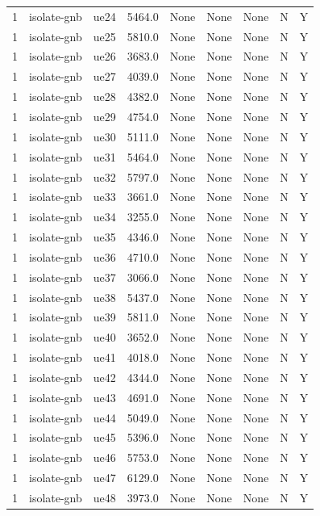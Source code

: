 \begin{table}[ht]
\begin{tabular}{|c|c|c|c|c|c|c|c|c|}
1 & isolate-gnb & ue24 & 5464.0 & None & None & None & N & Y \\
1 & isolate-gnb & ue25 & 5810.0 & None & None & None & N & Y \\
1 & isolate-gnb & ue26 & 3683.0 & None & None & None & N & Y \\
1 & isolate-gnb & ue27 & 4039.0 & None & None & None & N & Y \\
1 & isolate-gnb & ue28 & 4382.0 & None & None & None & N & Y \\
1 & isolate-gnb & ue29 & 4754.0 & None & None & None & N & Y \\
1 & isolate-gnb & ue30 & 5111.0 & None & None & None & N & Y \\
1 & isolate-gnb & ue31 & 5464.0 & None & None & None & N & Y \\
1 & isolate-gnb & ue32 & 5797.0 & None & None & None & N & Y \\
1 & isolate-gnb & ue33 & 3661.0 & None & None & None & N & Y \\
1 & isolate-gnb & ue34 & 3255.0 & None & None & None & N & Y \\
1 & isolate-gnb & ue35 & 4346.0 & None & None & None & N & Y \\
1 & isolate-gnb & ue36 & 4710.0 & None & None & None & N & Y \\
1 & isolate-gnb & ue37 & 3066.0 & None & None & None & N & Y \\
1 & isolate-gnb & ue38 & 5437.0 & None & None & None & N & Y \\
1 & isolate-gnb & ue39 & 5811.0 & None & None & None & N & Y \\
1 & isolate-gnb & ue40 & 3652.0 & None & None & None & N & Y \\
1 & isolate-gnb & ue41 & 4018.0 & None & None & None & N & Y \\
1 & isolate-gnb & ue42 & 4344.0 & None & None & None & N & Y \\
1 & isolate-gnb & ue43 & 4691.0 & None & None & None & N & Y \\
1 & isolate-gnb & ue44 & 5049.0 & None & None & None & N & Y \\
1 & isolate-gnb & ue45 & 5396.0 & None & None & None & N & Y \\
1 & isolate-gnb & ue46 & 5753.0 & None & None & None & N & Y \\
1 & isolate-gnb & ue47 & 6129.0 & None & None & None & N & Y \\
1 & isolate-gnb & ue48 & 3973.0 & None & None & None & N & Y \\

\end{tabular}
\end{table}
